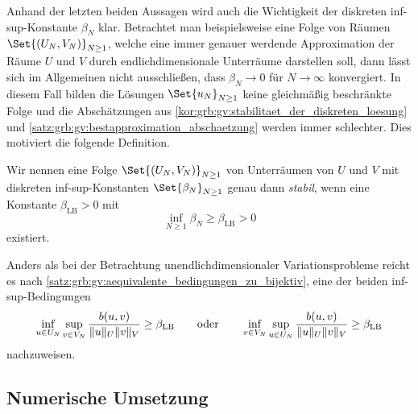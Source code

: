 Anhand der letzten beiden Aussagen wird auch die Wichtigkeit der diskreten inf-sup-Konstante $\beta_{N}$ klar.
Betrachtet man beispielsweise eine Folge von Räumen $\Set{(U_{N}, V_{N})}_{N \geq 1}$, welche eine immer genauer werdende Approximation der Räume $U$ und $V$ durch endlichdimensionale Unterräume darstellen soll, dann lässt sich im Allgemeinen nicht ausschließen, dass $\beta_{N} \to 0$ für $N \to \infty$ konvergiert.
In diesem Fall bilden die Lösungen $\Set{u_{N}}_{N \geq 1}$ keine gleichmäßig beschränkte Folge und die Abschätzungen aus \cref{kor:grb:gv:stabilitaet_der_diskreten_loesung} und \cref{satz:grb:gv:bestapproximation_abschaetzung} werden immer schlechter.
Dies motiviert die folgende Definition.

\begin{Definition}
\label{def:grb:gv:stabile_diskretisierung}
    Wir nennen eine Folge $\Set{(U_{N}, V_{N})}_{N \geq 1}$ von Unterräumen von $U$ und $V$ mit diskreten inf-sup-Konstanten $\Set{\beta_{N}}_{N \geq 1}$ genau dann \emph{stabil}, wenn eine Konstante $\beta_{\mathrm{LB}} > 0$ mit
    \begin{equation}
        \label{eq:grb:gv:stabile_diskretisierung_inf_sup_lower_bound}
        \inf_{N \geq 1} \beta_{N} \geq \beta_{\mathrm{LB}} > 0
    \end{equation}
    existiert.
\end{Definition}

Anders als bei der Betrachtung unendlichdimensionaler Variationsprobleme reicht es nach \cref{satz:grb:gv:aequivalente_bedingungen_zu_bijektiv}, eine der beiden inf-sup-Bedingungen
\begin{equation}
    \inf_{u \in U_{N}} \sup_{v \in V_{N}} \frac{b(u, v)}{\lVert u\rVert_{U} \lVert v\rVert_{V}}
    \geq \beta_{\mathrm{LB}}
    \qquad \text{oder} \qquad
     \inf_{v \in V_{N}} \sup_{u \in U_{N}} \frac{b(u, v)}{\lVert u\rVert_{U} \lVert v\rVert_{V}}
    \geq \beta_{\mathrm{LB}}
\end{equation}
nachzuweisen.



\subsection{Numerische Umsetzung} %
\label{sub:grb:gv:numerische_umsetzung}




